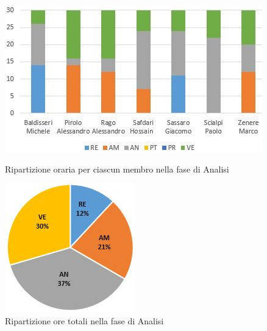 \begin{figure}[!htb]
   \begin{minipage}{0.6\textwidth}
     \centering
     \includegraphics{Images/PO-Analisi}
     \caption{Ripartizione oraria per ciascun membro nella fase di Analisi}
   \end{minipage}\hspace{.1\textwidth}
   \begin{minipage}{0.3\textwidth}
     \centering
     \includegraphics[width=.9\textwidth]{Images/PE-Analisi}
     \captionsetup{width=.9\textwidth}
     \caption{Ripartizione ore totali nella fase di Analisi}
   \end{minipage}
\end{figure}